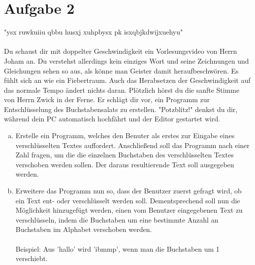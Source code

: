 \documentclass{standalone}
\begin{document}
\section{Aufgabe 2}
    "ysx ruwkuiiu qbbu husxj xuhpbysx pk isxqbjkdwijxuehyu"\\ \\
    Du schaust dir mit doppelter Geschwindigkeit ein Vorlesungsvideo von Herrn Joham an. Du verstehst allerdings kein 
    einziges Wort und seine Zeichnungen und Gleichungen sehen so aus, als könne man Geister damit heraufbeschwören. 
    Es fühlt sich an wie ein Fiebertraum. Auch das Herabsetzen der Geschwindigkeit auf das 
    normale Tempo ändert nichts daran. Plötzlich hörst du die sanfte Stimme von Herrn Zwick in der Ferne. Er schlägt dir vor, 
    ein Programm zur Entschlüsselung des Buchstabensalats zu erstellen. "Potzblitz!" denkst du dir, während dein PC automatisch hochfährt
    und der Editor gestartet wird.

\begin{enumerate}[a)]
\item
    Erstelle ein Programm, welches den Benuter als erstes zur Eingabe eines verschlüsselten Textes auffordert. 
    Anschließend soll das Programm nach einer Zahl fragen, um die die einzelnen Buchstaben des verschlüsselten Textes
    verschoben werden sollen. Der daraus resultierende Text soll ausgegeben werden.

\item
    Erweitere das Programm nun so, dass der Benutzer zuerst gefragt wird, ob ein Text ent- oder verschlüsselt werden soll.
    Dementsprechend soll nun die Möglichkeit hinzugefügt werden, einen vom Benutzer eingegebenen Text zu verschlüsseln, indem 
    die Buchstaben um eine bestimmte Anzahl an Buchstaben im Alphabet verschoben werden.\\ \\
    Beispiel: Aus 'hallo' wird 'ibmmp', wenn man die Buchstaben um 1 verschiebt.

\end{enumerate}
\end{document}
